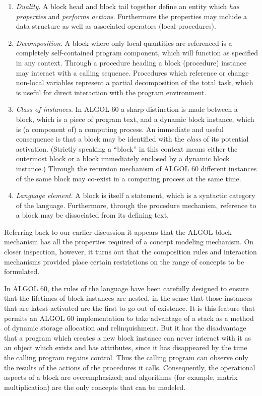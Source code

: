 \begin{enumerate}[wide, nosep, label=(\arabic*)]
	\item \textit{Duality}. A block head and block tail together define an entity which \textit{has properties} and \textit{performs actions}. Furthermore the properties may include a data structure as well as associated operators (local procedures).
	
	\item \textit{Decomposition}. A block where only local quantities are referenced is a completely self-contained program component, which will function as specified in any context. Through a procedure heading a block (procedure) instance may interact with a calling sequence. Procedures which reference or change non-local variables represent a partial decomposition of the total task, which is useful for direct interaction with the program environment.

	\item \textit{Class of instances}. In ALGOL 60 a sharp distinction is made between a block, which is a piece of program text, and a dynamic block instance, which is (a component of) a computing process. An immediate and useful consequence is that a block may be identified with the \textit{class} of its potential activation. (Strictly speaking a ``block'' in this context means either the outermost block or a block immediately enclosed by a dynamic block instance.) Through the recursion mechanism of ALGOL 60 different instances of the same block may co-exist in a computing process at the same time.

	\item \textit{Language element}. A block is itself a statement, which is a syntactic category of the language. Furthermore, through the procedure mechanism, reference to a block may be dissociated from its defining text.
\end{enumerate}

Referring back to our earlier discussion it appears that the ALGOL block mechanism has all the properties required of a concept modeling mechanism. On closer inspection, however, it turns out that the composition rules and interaction mechanisms provided place certain restrictions on the range of concepts to be formulated.

In ALGOL 60, the rules of the language have been carefully designed to ensure that the lifetimes of block instances are nested, in the sense that those instances that are latest activated are the first to go out of existence. It is this feature that permits an ALGOL 60 implementation to take advantage of a stack as a method of dynamic storage allocation and relinquishment. But it has the disadvantage that a program which creates a new block instance can never interact with it as an object which exists and has attributes, since it has disappeared by the time the calling program regains control. Thus the calling program can observe only the results of the actions of the procedures it calls. Consequently, the operational aspects of a block are overemphasized; and algorithms (for example, matrix multiplication) are the only concepts that can be modeled.

